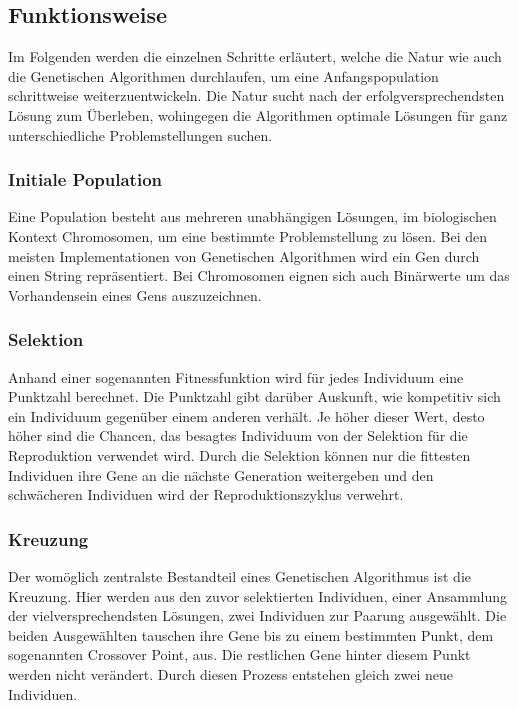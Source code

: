 \subsection{Funktionsweise}

Im Folgenden werden die einzelnen Schritte erläutert, welche die Natur wie auch die Genetischen
Algorithmen durchlaufen, um eine Anfangspopulation schrittweise weiterzuentwickeln. Die Natur
sucht nach der erfolgversprechendsten Lösung zum Überleben, wohingegen die Algorithmen
optimale Lösungen für ganz unterschiedliche Problemstellungen suchen. \cite{Mal17}

\subsubsection{Initiale Population}
Eine Population besteht aus mehreren unabhängigen Lösungen, im biologischen Kontext Chromosomen,
um eine bestimmte Problemstellung zu lösen. Bei den meisten Implementationen von Genetischen
Algorithmen wird ein Gen durch einen String repräsentiert. Bei Chromosomen eignen sich auch
Binärwerte um das Vorhandensein eines Gens auszuzeichnen.

\subsubsection{Selektion}
Anhand einer sogenannten Fitnessfunktion wird für jedes Individuum eine Punktzahl berechnet.
Die Punktzahl gibt darüber Auskunft, wie kompetitiv sich ein Individuum gegenüber einem anderen
verhält. Je höher dieser Wert, desto höher sind die Chancen, das besagtes Individuum von der
Selektion für die Reproduktion verwendet wird. Durch die Selektion können nur die fittesten
Individuen ihre Gene an die nächste Generation weitergeben und den schwächeren Individuen wird
der Reproduktionszyklus verwehrt.

\subsubsection{Kreuzung}
Der womöglich zentralste Bestandteil eines Genetischen Algorithmus ist die Kreuzung. Hier werden
aus den zuvor selektierten Individuen, einer Ansammlung der vielversprechendsten Lösungen, zwei
Individuen zur Paarung ausgewählt. Die beiden Ausgewählten tauschen ihre Gene bis zu einem bestimmten
Punkt, dem sogenannten Crossover Point, aus. Die restlichen Gene hinter diesem Punkt werden nicht
verändert. Durch diesen Prozess entstehen gleich zwei neue Individuen.

